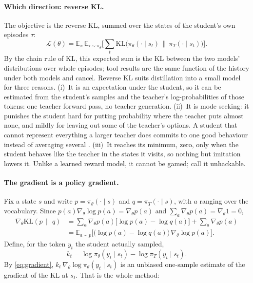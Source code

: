 \documentclass[11pt,a4paper]{article}
\newcommand{\pis}{\pi_\theta}
\newcommand{\pit}{\pi_T}
\newcommand{\KL}{\mathrm{KL}}
\newcommand{\E}{\mathbb{E}}
\begin{document}
\paragraph{Which direction: reverse KL.}
The objective is the reverse KL, summed over the states of the student's own
episodes $\tau$:
\begin{equation}
  \mathcal{L}(\theta) = \E_{x}\,\E_{\tau\sim\pis}\Big[\sum_{t}
  \KL\big(\pis(\cdot\mid s_t)\,\big\|\,\pit(\cdot\mid s_t)\big)\Big].
  \label{eq:objective}
\end{equation}
By the chain rule of KL, this expected sum is the KL between the two models'
distributions over whole episodes; tool results are the same function of the
history under both models and cancel. Reverse KL suits distillation into a
small model for three reasons. (i)~It is an expectation under the student,
so it can be estimated from the student's samples and the teacher's
log-probabilities of those tokens: one teacher forward pass, no teacher
generation. (ii)~It is mode seeking: it punishes the student hard for
putting probability where the teacher puts almost none, and mildly for
leaving out some of the teacher's options. A student that cannot represent
everything a larger teacher does commits to one good behaviour instead of
averaging several \citep{gu2024minillm,lu2025onpolicy}. (iii)~It reaches its
minimum, zero, only when the student behaves like the teacher in the states
it visits, so nothing but imitation lowers it. Unlike a learned reward
model, it cannot be gamed; \citet{lu2025onpolicy} call it unhackable.

\paragraph{The gradient is a policy gradient.}
Fix a state $s$ and write $p=\pis(\cdot\mid s)$ and $q=\pit(\cdot\mid s)$,
with $a$ ranging over the vocabulary. Since $p(a)\nabla_\theta\log
p(a)=\nabla_\theta p(a)$ and $\sum_a\nabla_\theta p(a)=\nabla_\theta 1=0$,
\begin{align}
  \nabla_\theta \KL(p\,\|\,q)
  &= \sum_a \nabla_\theta p(a)\big[\log p(a)-\log q(a)\big]
    + \sum_a \nabla_\theta p(a) \nonumber\\
  &= \E_{a\sim p}\Big[\big(\log p(a)-\log q(a)\big)\,\nabla_\theta\log p(a)\Big].
  \label{eq:gradient}
\end{align}
Define, for the token $y_t$ the student actually sampled,
\begin{equation}
  k_t = \log\pis(y_t\mid s_t) - \log\pit(y_t\mid s_t).
  \label{eq:k}
\end{equation}
By \eqref{eq:gradient}, $k_t\,\nabla_\theta\log\pis(y_t\mid s_t)$ is an
unbiased one-sample estimate of the gradient of the KL at $s_t$. That is the
whole method:
\end{document}
